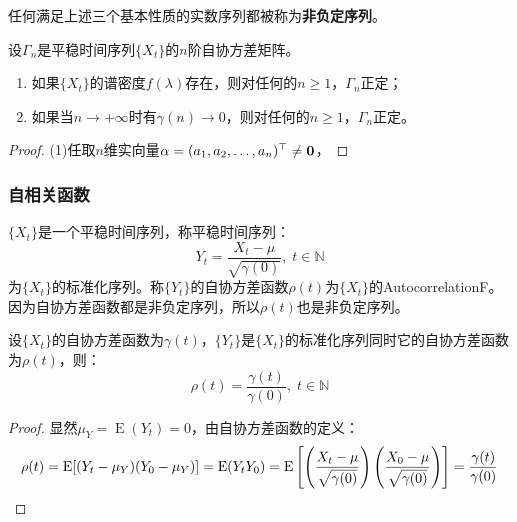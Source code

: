 \begin{definition}
	任何满足上述三个基本性质的实数序列都被称为\textbf{非负定序列}。
\end{definition}
\begin{theorem}\label{theo:GammaPositiveDefinite}
	设$\Gamma_n$是平稳时间序列$\{X_t\}$的$n$阶自协方差矩阵。
	\begin{enumerate}
		\item 如果$\{X_t\}$的谱密度$f(\lambda)$存在，则对任何的$n\geqslant1$，$\Gamma_n$正定；
		\item 如果当$n\to+\infty$时有$\gamma(n)\to0$，则对任何的$n\geqslant1$，$\Gamma_n$正定。
	\end{enumerate}
\end{theorem}
\begin{proof}
	(1)任取$n$维实向量$\alpha=(a_1, a_2, \dots, a_{n})^{\top}\ne\mathbf{0}$，
\end{proof}
\subsubsection{自相关函数}
\begin{definition}
	$\{X_t\}$是一个平稳时间序列，称平稳时间序列：
	\begin{equation*}
		Y_t=\frac{X_t-\mu}{\sqrt{\gamma(0)}},\;t\in\mathbb{N}
	\end{equation*}
	为$\{X_t\}$的标准化序列。称$\{Y_t\}$的自协方差函数$\rho(t)$为$\{X_t\}$的\gls{AutocorrelationF}。因为自协方差函数都是非负定序列，所以$\rho(t)$也是非负定序列。
\end{definition}
\begin{theorem}\label{theo:RhotGamma0}
	设$\{X_t\}$的自协方差函数为$\gamma(t)$，$\{Y_t\}$是$\{X_t\}$的标准化序列同时它的自协方差函数为$\rho(t)$，则：
	\begin{equation*}
		\rho(t)=\frac{\gamma(t)}{\gamma(0)},\;t\in\mathbb{N}
	\end{equation*}
\end{theorem}
\begin{proof}
	显然$\mu_Y=\operatorname{E}(Y_t)=0$，由自协方差函数的定义：
	\begin{equation*}
		\rho(t)=\operatorname{E}[(Y_t-\mu_Y)(Y_0-\mu_Y)]=\operatorname{E}(Y_tY_0)=\operatorname{E}\left[\left(\frac{X_t-\mu}{\sqrt{\gamma(0)}}\right)\left(\frac{X_0-\mu}{\sqrt{\gamma(0)}}\right)\right]=\frac{\gamma(t)}{\gamma(0)}\qedhere
	\end{equation*}
\end{proof}

